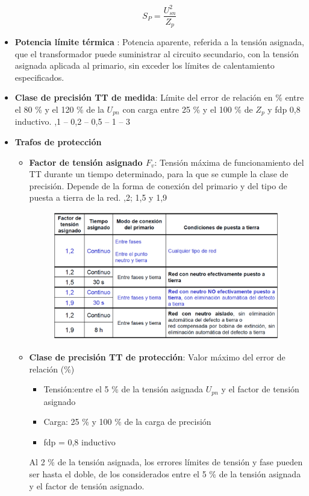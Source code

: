 \begin{itemize}
	\begin{equation}
		S_P=\dfrac{U^2_{sn}}{Z_p}
	\end{equation}
	\item \textbf{Potencia límite térmica }: Potencia aparente, referida a la tensión asignada, que el transformador puede suministrar al circuito secundario, con la tensión asignada aplicada al primario, sin exceder los límites de calentamiento especificados.
	\item \textbf{Clase de precisión TT de medida}: Límite del error de relación en \% entre el 80 \% y el 120 \% de la $U_{pn}$ con carga entre 25 \% y el 100 \% de $Z_p$ y fdp 0,8 inductivo. 
	,1 – 0,2 – 0,5 – 1 – 3
	\item \textbf{Trafos de protección}
	\begin{itemize}
		\item \textbf{Factor de tensión asignado $F_v$}: Tensión máxima de funcionamiento del TT durante un tiempo determinado, para la que se cumple la clase de precisión. Depende de la forma de conexión del primario y del tipo de puesta a tierra de la red.
		,2; 1,5 y 1,9
		\begin{figure}[H]
			\centering
			\includegraphics[width=0.7\linewidth]{Images/50}
			\label{fig:50}
		\end{figure}
		
		
		
		\item \textbf{Clase de precisión TT de protección}:  Valor máximo del error de relación (\%)
		\begin{itemize}
			\item Tensión:entre el 5 \% de la tensión asignada $U_{pn}$ y el factor de tensión asignado
			\item Carga: 25 \% y 100 \% de la carga de precisión
			\item fdp = 0,8 inductivo
		\end{itemize}
		Al 2 \% de la tensión asignada, los errores límites de tensión y fase pueden ser hasta el doble, de los considerados entre el 5 \% de la tensión asignada y el factor de tensión asignado.


\end{itemize}
\end{itemize}
